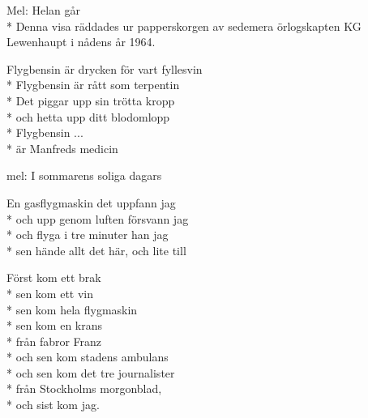 
\pagestyle{Flygarsånger}


\begin{SongText}
    \begin{SongInfo}
        Mel: Helan går\\*%
        Denna visa räddades ur papperskorgen av sedemera örlogskapten KG Lewenhaupt i nådens år 1964.
    \end{SongInfo}
    \begin{Verse}
        Flygbensin är drycken för vart fyllesvin\\*%
        Flygbensin är rått som terpentin\\*%
        Det piggar upp sin trötta kropp\\*%
        och hetta upp ditt blodomlopp\\*%
        Flygbensin ...\\*%
        är Manfreds medicin
    \end{Verse}
\end{SongText}
\begin{SongText}[Gasflygmaskinen]
    \begin{SongInfo}
        mel: I sommarens soliga dagars
    \end{SongInfo}
    \begin{Verse}
        En gasflygmaskin det uppfann jag\\*%
        och upp genom luften försvann jag\\*%
        och flyga i tre minuter han jag\\*%
        sen hände allt det här, och lite till
    \end{Verse}
    \begin{Verse}
        Först kom ett brak\\*%
        sen kom ett vin\\*%
        sen kom hela flygmaskin\\*%
        sen kom en krans\\*%
        från fabror Franz\\*%
        och sen kom stadens ambulans\\*%
        och sen kom det tre journalister\\*%
        från Stockholms morgonblad,\\*%
        och sist kom jag.
    \end{Verse}
\end{SongText}
